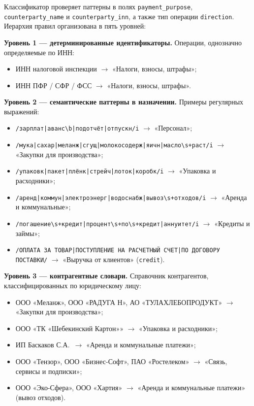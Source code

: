 Классификатор проверяет паттерны в полях \texttt{payment\_purpose}, \texttt{counterparty\_name} и \texttt{counterparty\_inn}, а также тип операции \texttt{direction}. Иерархия правил организована в пять уровней:

\textbf{Уровень 1 --- детерминированные идентификаторы.} Операции, однозначно определяемые по ИНН:
\begin{itemize}
  \item ИНН налоговой инспекции $\to$ «Налоги, взносы, штрафы»;
  \item ИНН ПФР / СФР / ФСС $\to$ «Налоги, взносы, штрафы».
\end{itemize}

\textbf{Уровень 2 --- семантические паттерны в назначении.} Примеры регулярных выражений:
\begin{itemize}
  \item \texttt{/зарплат|аванс\textbackslash b|подотчёт|отпускн/i} $\to$ «Персонал»;
  \item \texttt{/мука|сахар|меланж|сгущ|молокосодерж|яичн|масло\textbackslash s+раст/i} $\to$ «Закупки для производства»;
  \item \texttt{/упаковк|пакет|плёнк|стрейч|лоток|коробк/i} $\to$ «Упаковка и расходники»;
  \item \texttt{/аренд|коммун|электроэнерг|водоснабж|вывоз\textbackslash s+отходов/i} $\to$ «Аренда и коммунальные»;
  \item \texttt{/погашение\textbackslash s+кредит|процент\textbackslash s+по\textbackslash s+кредит|аннуитет/i} $\to$ «Кредиты и займы»;
  \item \texttt{/ОПЛАТА ЗА ТОВАР|ПОСТУПЛЕНИЕ НА РАСЧЕТНЫЙ СЧЕТ|ПО ДОГОВОРУ ПОСТАВКИ/} $\to$ «Выручка от клиентов» (\texttt{credit}).
\end{itemize}

\textbf{Уровень 3 --- контрагентные словари.} Справочник контрагентов, классифицированных по юридическому лицу:
\begin{itemize}
  \item ООО «Меланж», ООО «РАДУГА Н», АО «ТУЛАХЛЕБОПРОДУКТ» $\to$ «Закупки для производства»;
  \item ООО «ТК «Шебекинский Картон»» $\to$ «Упаковка и расходники»;
  \item ИП Баскаков С.А.\ $\to$ «Аренда и коммунальные платежи»;
  \item ООО «Тензор», ООО «Бизнес-Софт», ПАО «Ростелеком» $\to$ «Связь, сервисы и подписки»;
  \item ООО «Эко-Сфера», ООО «Хартия» $\to$ «Аренда и коммунальные платежи» (вывоз отходов).
\end{itemize}

